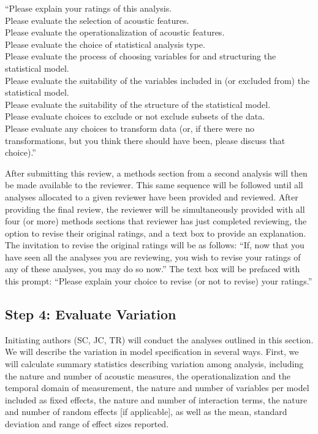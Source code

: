 \documentclass[
  english,
  man]{apa6}
\begin{document}
\noindent \enquote{Please explain your ratings of this analysis.\\
\noindent Please evaluate the selection of acoustic features.\\
\noindent Please evaluate the operationalization of acoustic features.\\
\noindent Please evaluate the choice of statistical analysis type.\\
\noindent Please evaluate the process of choosing variables for and structuring the statistical model.\\
\noindent Please evaluate the suitability of the variables included in (or excluded from) the statistical model.\\
\noindent Please evaluate the suitability of the structure of the statistical model.\\
\noindent Please evaluate choices to exclude or not exclude subsets of the data.\\
\noindent Please evaluate any choices to transform data (or, if there were no transformations, but you think there should have been, please discuss that choice).}

After submitting this review, a methods section from a second analysis will then be made available to the reviewer.
This same sequence will be followed until all analyses allocated to a given reviewer have been provided and reviewed.
After providing the final review, the reviewer will be simultaneously provided with all four (or more) methods sections that reviewer has just completed reviewing, the option to revise their original ratings, and a text box to provide an explanation.
The invitation to revise the original ratings will be as follows: \enquote{If, now that you have seen all the analyses you are reviewing, you wish to revise your ratings of any of these analyses, you may do so now.}
The text box will be prefaced with this prompt: \enquote{Please explain your choice to revise (or not to revise) your ratings.}

\hypertarget{step-4-evaluate-variation}{%
\subsection{Step 4: Evaluate Variation}\label{step-4-evaluate-variation}}

Initiating authors (SC, JC, TR) will conduct the analyses outlined in this section.
We will describe the variation in model specification in several ways.
First, we will calculate summary statistics describing variation among analysis, including the nature and number of acoustic measures, the operationalization and the temporal domain of measurement, the nature and number of variables per model included as fixed effects, the nature and number of interaction terms, the nature and number of random effects {[}if applicable{]}, as well as the mean, standard deviation and range of effect sizes reported.
\end{document}
